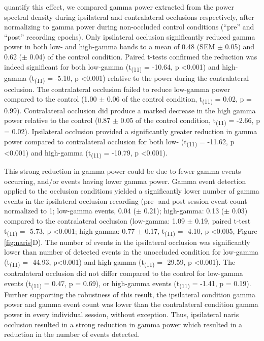 \documentclass[11pt]{article}
\begin{document}
quantify this effect, we compared gamma power extracted from the power
spectral density during ipsilateral and contralateral occlusions
respectively, after normalizing to gamma power during non-occluded
control conditions (``pre'' and ``post'' recording epochs). Only
ipsilateral occlusion significantly reduced gamma power in both low-
and high-gamma bands to a mean of 0.48 (SEM $\pm$ 0.05) and 0.62
($\pm$ 0.04) of the control condition.  Paired t-tests confirmed the
reduction was indeed significant for both low-gamma
(t\textsubscript{(11)} = -10.64, p \textless 0.001) and high-gamma
(t\textsubscript{(11)} = -5.10, p \textless 0.001) relative to the
power during the contralateral occlusion.  The contralateral occlusion
failed to reduce low-gamma power compared to the control (1.00 $\pm$
0.06 of the control condition, t\textsubscript{(11)} = 0.02, p =
0.99).  Contralateral occlusion did produce a marked decrease in the
high gamma power relative to the control (0.87 $\pm$ 0.05 of the
control condition, t\textsubscript{(11)} = -2.66, p = 0.02).
Ipsilateral occlusion provided a significantly greater reduction in
gamma power compared to contralateral occlusion for both low-
(t\textsubscript{(11)} = -11.62, p \textless 0.001) and high-gamma
(t\textsubscript{(11)} = -10.79, p \textless 0.001).

This strong reduction in gamma power could be due to fewer gamma
events occurring, and/or events having lower gamma power. Gamma event
detection applied to the occlusion conditions yielded a significantly
lower number of gamma events in the ipsilateral occlusion recording
(pre- and post session event count normalized to 1; low-gamma events,
0.04 ($\pm$ 0.21); high-gamma: 0.13 ($\pm$ 0.03) compared to the
contralateral occlusion (low-gamma: 1.09 $\pm$ 0.19, paired t-test
t\textsubscript{(11)} = -5.73, p \textless 0.001; high-gamma: 0.77
$\pm$ 0.17, t\textsubscript{(11)} = -4.10, p \textless 0.005, Figure
\ref{fig:naris}D). The number of events in the ipsilateral occlusion
was significantly lower than number of detected events in the
unoccluded condition for low-gamma (t\textsubscript{(11)} = -44.93,
p\textless 0.001) and high-gamma (t\textsubscript{(11)} = -29.59, p
\textless 0.001). The contralateral occlusion did not differ compared
to the control for low-gamma events (t\textsubscript{(11)} = 0.47, p =
0.69), or high-gamma events (t\textsubscript{(11)} = -1.41, p =
0.19). Further supporting the robustness of this result, the
ipsilateral condition gamma power and gamma event count was lower than
the contralateral condition gamma power in every individual session,
without exception. Thus, ipsilateral naris occlusion resulted in a
strong reduction in gamma power which resulted in a reduction in the
number of events detected.
\end{document}
